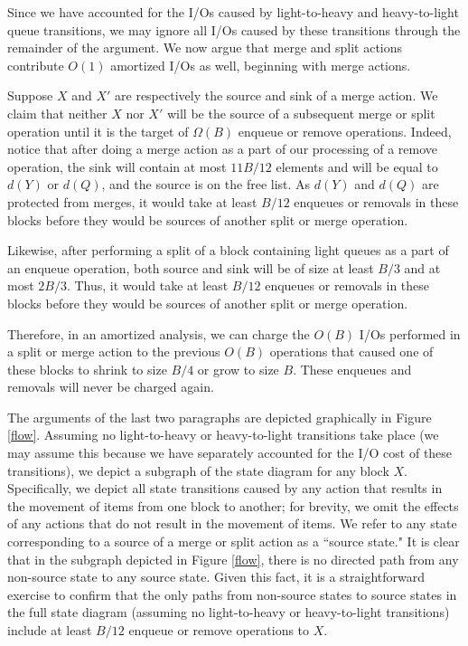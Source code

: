 \documentclass[11pt,letterpaper]{article}
\newcommand{\eat}[1]{}
\begin{document}
Since we have accounted for the I/Os caused by light-to-heavy and heavy-to-light queue transitions, we may ignore all I/Os caused by
these transitions through the remainder of the argument.
We now argue that merge and split actions contribute $O(1)$ amortized I/Os as well, beginning with merge actions.

Suppose $X$ and $X'$ are respectively 
the source and sink of a merge action. We claim that neither $X$ nor $X'$ will be the source of a subsequent merge or split operation until it is the target of $\Omega(B)$ enqueue
or remove operations.
Indeed, notice that after doing a merge action as a part of our
processing of a remove operation,
the sink will
contain at most $11B/12$ elements and will be equal to $d(Y)$  or $d(Q)$, and the source is on the free list.
As $d(Y)$ and $d(Q)$ are protected from merges, it would take at least $B/12$ enqueues or removals in these
blocks before they would be sources of another split or merge operation.

Likewise, after performing a split of a block containing light queues as a part of an enqueue operation,
both source and sink will be of size at least $B/3$ and at most
$2B/3$.
Thus, it would take at least $B/12$ enqueues or removals in these
blocks before they would be sources of another split or merge operation.

Therefore, in an amortized analysis, we can charge the $O(B)$ I/Os
performed in a split or merge action to the previous $O(B)$ operations
that caused one of these blocks to shrink to size $B/4$ or grow to
size $B$. These enqueues and removals will never be charged again.

The arguments of the last two paragraphs are depicted graphically in Figure \ref{flow}. Assuming no light-to-heavy or heavy-to-light transitions
take place (we may assume this because we have separately accounted for the I/O cost of these transitions), we depict a subgraph of
the state diagram for any block $X$. Specifically, we depict all state transitions caused by any action that results in the movement of items from one block to another; for brevity, we omit the effects of any actions that do not result in the movement of items. We refer to any state corresponding to a source
of a merge or split action as a ``source state." It is clear that in the subgraph depicted in Figure \ref{flow}, there is no directed path from any non-source state to any
source state. Given this fact, it is a straightforward exercise to confirm that the only paths from non-source states to source states in the full state diagram (assuming no light-to-heavy or heavy-to-light transitions)
include at least $B/12$ enqueue or remove operations to $X$.
\eat{ in the state diagram
from any non-source state to any source state. As all non-source states in Figure
that for any block $X$ that is a merge sink, merge source, split sink, or split source, at least $B/12$ enqueue or remove operations are necessary}
\end{document}
